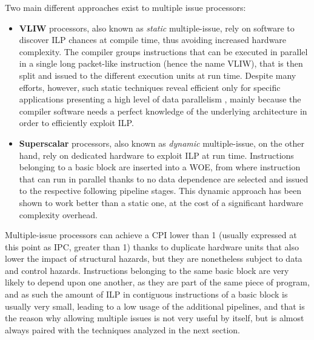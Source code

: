 Two main different approaches exist to multiple issue processors:
\begin{itemize}
  \item \textbf{\ac{VLIW}} processors, also known as \emph{static} multiple-issue, rely on software to discover \ac{ILP} chances at compile time, thus avoiding increased hardware complexity. The compiler groups instructions that can be executed in parallel in a single long packet-like instruction (hence the name \ac{VLIW}), that is then split and issued to the different execution units at run time. Despite many efforts, however, such static techniques reveal efficient only for specific applications presenting a high level of data parallelism \cite[p.~168]{hennessy17}, mainly because the compiler software needs a perfect knowledge of the underlying architecture in order to efficiently exploit \ac{ILP}.
  \item \textbf{Superscalar} processors, also known as \emph{dynamic} multiple-issue, on the other hand, rely on dedicated hardware to exploit \ac{ILP} at run time. Instructions belonging to a basic block are inserted into a \ac{WOE}, from where instruction that can run in parallel thanks to no data dependence are selected and issued to the respective following pipeline stages. This dynamic approach has been shown to work better than a static one, at the cost of a significant hardware complexity overhead.
\end{itemize}

Multiple-issue processors can achieve a \ac{CPI} lower than 1 (usually expressed at this point as \ac{IPC}, greater than 1) thanks to duplicate hardware units that also lower the impact of structural hazards, but they are nonetheless subject to data and control hazards. Instructions belonging to the same basic block are very likely to depend upon one another, as they are part of the same piece of program, and as such the amount of \ac{ILP} in contiguous instructions of a basic block is usually very small, leading to a low usage of the additional pipelines, and that is the reason why allowing multiple issues is not very useful by itself, but is almost always paired with the techniques analyzed in the next section.

